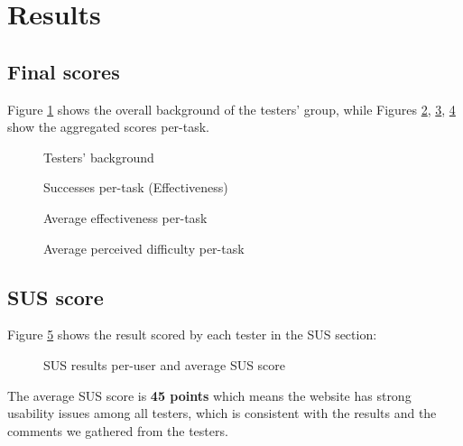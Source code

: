 \section{Results}
\subsection{Final scores}
Figure \ref{fig:background_pie} shows the overall background of the testers' group, while Figures \ref{fig:effec_chart}, \ref{fig:effic_chart}, \ref{fig:perc_eff_chart} show the aggregated scores per-task.

\begin{figure}[h]
	\centering
	
	\caption{Testers' background}
	\label{fig:background_pie}
\end{figure}

\begin{figure}[h]
	\centering
	
	\caption{Successes per-task (Effectiveness)}
	\label{fig:effec_chart}
\end{figure}

\begin{figure}[h]
	\centering
	
	\caption{Average effectiveness per-task}
	\label{fig:effic_chart}
\end{figure}

\begin{figure}[h]
	\centering
	
	\caption{Average perceived difficulty per-task}
	\label{fig:perc_eff_chart}
\end{figure}

\subsection{SUS score}
Figure \ref{fig:sus_result} shows the result scored by each tester in the SUS section:
\begin{figure}[h]
	\centering
	
	\caption{SUS results per-user and average SUS score}
	\label{fig:sus_result}
\end{figure}
The average SUS score is \textbf{45 points} which means the website has strong usability issues among all testers, which is consistent with the results and the comments we gathered from the testers.

